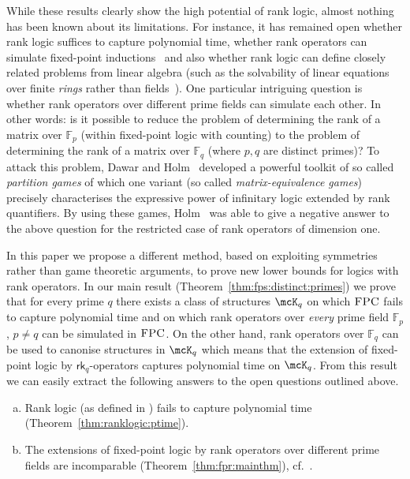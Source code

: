 \documentclass[a4paper,UKenglish]{lipics}
\newcommand{\field}[1]{\mathbb{#1}}
\newcommand{\logic}[1]{\ensuremath{\textsc{#1}}\xspace}
\newcommand{\FPC}{\logic{FPC}}
\newcommand{\rkx}[1]{\ensuremath{\textsf{rk}_{#1}}\xspace}
\theoremstyle{plain}
\begin{document}
\medskip
While these results clearly show the high potential of rank 
logic, almost nothing has been known about its limitations.
For instance, it has remained open whether rank logic suffices to capture 
polynomial time, whether rank operators can simulate fixed-point 
inductions~\cite{DaGrHoLa09} and also whether rank logic 
can define closely related problems from linear algebra 
(such as the solvability of linear equations over finite 
\emph{rings} rather than fields~\cite{DaGrHoKoPa13}).
One particular intriguing question is whether rank operators over 
different prime fields can simulate each other. In other words:
 is it possible to reduce the problem of determining the rank of a matrix over 
$\field F_p$ (within fixed-point logic with counting) to the 
problem of determining the rank of a matrix over $\field F_q$ (where $p, q$ are 
distinct primes)?
To attack this problem, Dawar and Holm~\cite{DaHo12, Ho10} 
developed a powerful toolkit of so called \emph{partition games} of which one 
variant (so called \emph{matrix-equivalence games}) precisely characterises the 
expressive power of infinitary logic extended by rank quantifiers.
By using these games, Holm~\cite{Ho10} was able to give a negative answer to 
the 
above question for the restricted case of rank operators of dimension one.

\smallskip
In this paper we propose a different method, based 
on exploiting symmetries rather than game theoretic arguments, to prove new 
lower bounds for logics with rank operators.
In our main result (Theorem~\ref{thm:fps:distinct:primes}) we prove that for 
every prime $q$ there exists a class of structures $\mcK_q$ on which \FPC fails 
to capture polynomial time and on which rank operators over \emph{every} prime 
field $\field F_p$, $p \neq q$ can be simulated in \FPC.
On the other hand, rank operators over $\field F_q$ can be used to canonise 
structures in $\mcK_q$ which means that the extension of fixed-point logic by
$\rkx{q}$-operators captures polynomial time on $\mcK_q$.
From this result we can easily extract the following answers to the open 
questions outlined above.
\begin{enumerate}[(a)]
 \item Rank logic (as defined in \cite{DaGrHoLa09}) fails to capture polynomial 
time (Theorem~\ref{thm:ranklogic:ptime}).
 \item The extensions of fixed-point logic by rank operators over 
different prime fields are incomparable (Theorem~\ref{thm:fpr:mainthm}), cf.\ 
\cite{Ho10,DaHo12,La11}.
\end{enumerate}
\end{document}
